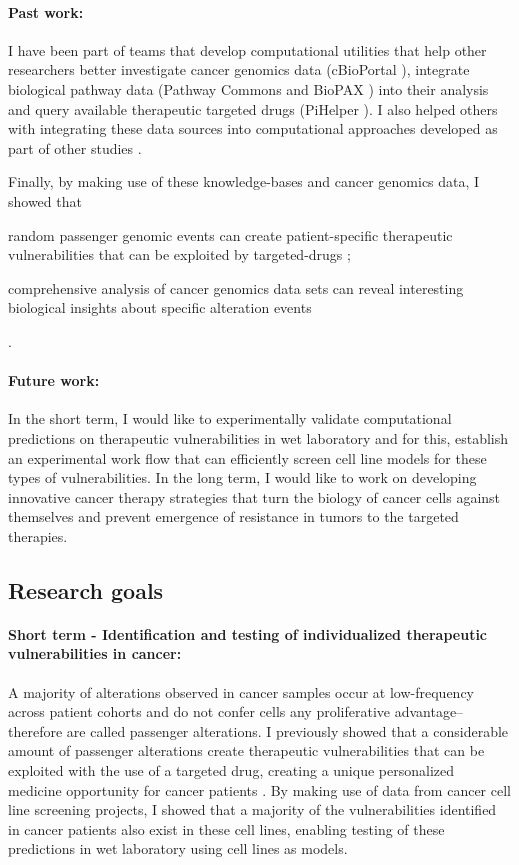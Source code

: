 \documentclass[11pt,letterpaper]{article}
\begin{document}
\paragraph{Past work:}
I have been part of teams that develop computational utilities that help other researchers better 
investigate cancer genomics data (cBioPortal \cite{gao2014cbioportal, cerami2012cbio}),
integrate biological pathway data (Pathway Commons and BioPAX \cite{demir2013using,babur2014integrating})
into their analysis and query available therapeutic targeted drugs (PiHelper \cite{aksoy2013pihelper}).
I also helped others with integrating these data sources into computational approaches developed as part of other studies \cite{ciriello2013emerging,korkut2014perturbation,babur2014systematic}.

Finally, by making use of these knowledge-bases and cancer genomics data, 
I showed that 
\begin{inparaenum}[(i)]
 \item random passenger genomic events can create patient-specific therapeutic vulnerabilities that can be exploited by targeted-drugs \cite{aksoy2014prediction};
 \item comprehensive analysis of cancer genomics data sets can reveal interesting biological insights about specific alteration events \cite{aksoy2014cancer}
\end{inparaenum}.

\paragraph{Future work:} 
In the short term, I would like to experimentally validate computational predictions on therapeutic vulnerabilities in wet laboratory
and for this, establish an experimental work flow that can efficiently screen cell line models for these types of vulnerabilities.
In the long term, I would like to work on developing innovative cancer therapy strategies that turn the biology of cancer cells against themselves and prevent emergence of resistance in tumors to the targeted therapies.

\subsection*{Research goals}
\paragraph{Short term - Identification and testing of individualized therapeutic vulnerabilities in cancer:}
A majority of alterations observed in cancer samples occur at low-frequency across patient cohorts
and do not confer cells any proliferative advantage--therefore are called passenger alterations.
I previously showed that a considerable amount of passenger alterations create therapeutic vulnerabilities that can be exploited with the use of a targeted drug, creating a unique personalized medicine opportunity for cancer patients \cite{aksoy2014prediction}.
By making use of data from cancer cell line screening projects,
I showed that a majority of the vulnerabilities identified in cancer patients also exist in these cell lines,
enabling testing of these predictions in wet laboratory using cell lines as models.
\end{document}
